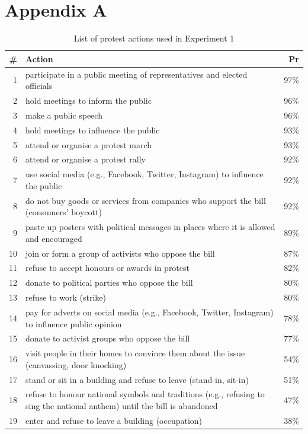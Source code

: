 \documentclass[twocolumn, 11pt, letterpaper]{article}
\begin{document}
\begin{table}

\section{Appendix A}

\caption{List of protest actions used in Experiment 1}
\small
\begin{tabularx}{\linewidth}{rXr}
\addlinespace
\toprule
\# & Action & Pr\\
\midrule
1 & participate in a public meeting of representatives and elected officials & 97\%\\
2 & hold meetings to inform the public & 96\%\\
3 & make a public speech & 96\%\\
4 & hold meetings to influence the public & 93\%\\
5 & attend or organise a protest march & 93\%\\
6 & attend or organise a protest rally & 92\%\\
7 & use social media (e.g., Facebook, Twitter, Instagram) to influence the public & 92\%\\
8 & do not buy goods or services from companies who support the bill (consumers' boycott) & 92\%\\
9 & paste up posters with political messages in places where it is allowed and encouraged & 89\%\\
10 & join or form a group of activists who oppose the bill & 87\%\\
11 & refuse to accept honours or awards in protest & 82\%\\
12 & donate to political parties who oppose the bill & 80\%\\
13 & refuse to work (strike) & 80\%\\
14 & pay for adverts on social media (e.g., Facebook, Twitter, Instagram) to influence public opinion & 78\%\\
15 & donate to activist groups who oppose the bill & 77\%\\
16 & visit people in their homes to convince them about the issue (canvassing, door knocking) & 54\%\\
17 & stand or sit in a building and refuse to leave (stand-in, sit-in) & 51\%\\
18 & refuse to honour national symbols and traditions (e.g., refusing to sing the national anthem) until the bill is abandoned & 47\%\\
19 & enter and refuse to leave a building (occupation) & 38\%\\

\end{tabularx}
\end{table}
\end{document}
